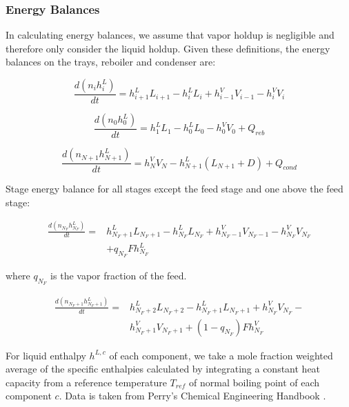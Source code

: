 \subsubsection{Energy Balances}

In calculating energy balances, we assume that vapor holdup is negligible and therefore only consider the liquid holdup. Given these definitions, the energy balances on the trays, reboiler and condenser are:

\begin{equation}
    \frac{d(n_ih^L_i)}{dt} =  h^L_{i+1}L_{i+1}-h^L_iL_i+h^V_{i-1}V_{i-1}-h^V_iV_i
\end{equation}

\begin{equation}
    \frac{d(n_0h^L_0)}{dt} = h^L_1L_1 - h^L_0L_0 - h^V_0V_0 + Q_{reb}
\end{equation}


\begin{equation}
    \frac{d(n_{N+1}h^L_{N+1})}{dt} = h^V_NV_{N}-h^L_{N+1}(L_{N+1} + D) + Q_{cond}
\end{equation}

Stage energy balance for all stages except the feed stage and  one above the feed stage:

\begin{equation}
\begin{split}
    \frac{d(n_{N_F}h^L_{N_F})}{dt} = & h^L_{N_F+1}L_{N_F+1}-h^L_{N_F}L_{N_F} + h^V_{N_F-1}V_{N_F-1}-h^V_{N_F}V_{N_F} \\ &  + q_{N_F}F h^L_{N_F}
\end{split}
\end{equation}

where $q_{N_F}$ is the vapor fraction of the feed.

\begin{equation}
\begin{split}
    \frac{d(n_{N_F+1}h^L_{N_F+1})}{dt} = & h^L_{N_F+2}L_{N_F+2}-h^L_{N_F+1}L_{N_F+1} +h^V_{N_F} V_{N_F}-\\ &h^V_{N_F+1} V_{N_F+1} + (1-q_{N_F})Fh^V_{N_F}
\end{split}
\end{equation}

For liquid enthalpy $h^{L,c}$ of each component, we take a mole fraction weighted average of the specific enthalpies calculated by integrating a constant heat capacity from a reference temperature $T_{ref}$ of normal boiling point of each component $c$. Data is taken from Perry’s Chemical Engineering Handbook \cite{Perrys2018}.


